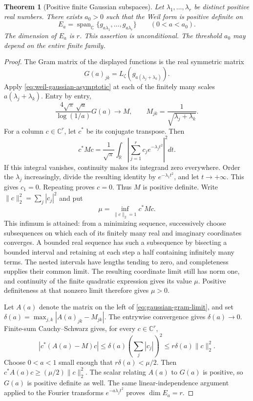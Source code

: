 \documentclass[11pt]{article}
\newtheorem{theorem}{Theorem}[section]
\theoremstyle{definition}
\theoremstyle{remark}
\numberwithin{equation}{section}
\newcommand{\R}{\mathbb R}
\newcommand{\C}{\mathbb C}
\begin{document}
\begin{theorem}[Positive finite Gaussian subspaces]
\label{thm:gaussian-subspaces}
Let $\lambda_1,\ldots,\lambda_r$ be distinct positive real numbers.
There exists $a_0>0$ such that the Weil form is positive definite on
\[
 E_a=\operatorname{span}_{\C}\{g_{a\lambda_1},\ldots,g_{a\lambda_r}\}
 \qquad(0<a<a_0).
\]
The dimension of $E_a$ is $r$.  This assertion is unconditional.
The threshold $a_0$ may depend on the entire finite family.
\end{theorem}

\begin{proof}
The Gram matrix of the displayed functions is the real symmetric matrix
\[
 G(a)_{jk}=L_\zeta(g_{a(\lambda_j+\lambda_k)}).
\]
Apply \eqref{eq:weil-gaussian-asymptotic} at each of the finitely many
scales $a(\lambda_j+\lambda_k)$.  Entry by entry,
\begin{equation}
 \frac{4\sqrt\pi\,\sqrt a}{\log(1/a)}G(a)
 \longrightarrow M,
 \qquad M_{jk}=\frac1{\sqrt{\lambda_j+\lambda_k}}.
 \label{eq:gaussian-gram-limit}
\end{equation}
For a column $c\in\C^r$, let $c^*$ be its conjugate transpose.  Then
\begin{equation}
 c^*Mc=\frac1{\sqrt\pi}\int_{\R}
       \left|\sum_{j=1}^r c_j e^{-\lambda_j t^2}\right|^2dt.
 \label{eq:limiting-gaussian-gram}
\end{equation}
If this integral vanishes, continuity makes its integrand zero everywhere.
Order the $\lambda_j$ increasingly, divide the resulting identity by
$e^{-\lambda_1t^2}$, and let $t\to+\infty$.
This gives $c_1=0$.  Repeating proves $c=0$.
Thus $M$ is positive definite.
Write $\|c\|_2^2=\sum_j|c_j|^2$ and put
\[
 \mu=\inf_{\|c\|_2=1}c^*Mc.
\]
This infimum is attained: from a minimizing sequence, successively
choose subsequences on which each of its finitely many real and imaginary
coordinates converges.  A bounded real sequence has such a subsequence
by bisecting a bounded interval and retaining at each step a half
containing infinitely many terms.  The nested intervals have lengths
tending to zero, and completeness supplies their common limit.
The resulting coordinate limit still has norm one, and continuity of
the finite quadratic expression gives its value $\mu$.
Positive definiteness at that nonzero limit therefore gives $\mu>0$.

Let $A(a)$ denote the matrix on the left of
\eqref{eq:gaussian-gram-limit}, and set
$\delta(a)=\max_{j,k}|A(a)_{jk}-M_{jk}|$.
The entrywise convergence gives $\delta(a)\to0$.
Finite-sum Cauchy--Schwarz gives, for every $c\in\C^r$,
\[
 |c^*(A(a)-M)c|
 \leq\delta(a)\left(\sum_j|c_j|\right)^2
 \leq r\delta(a)\|c\|_2^2.
\]
Choose $0<a<1$ small enough that $r\delta(a)<\mu/2$.
Then $c^*A(a)c\geq(\mu/2)\|c\|_2^2$.
The scalar relating $A(a)$ to $G(a)$ is positive, so $G(a)$ is positive
definite as well.
The same linear-independence argument applied to the Fourier transforms
$e^{-a\lambda_jt^2}$ proves $\dim E_a=r$.
\end{proof}
\end{document}
